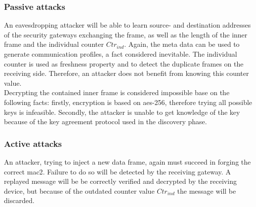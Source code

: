 \subsubsection{Passive attacks}
An eavesdropping attacker will be able to learn source- and destination addresses of the security gateways exchanging the frame, as well as the length of the inner frame and the
individual counter $Ctr_{ind}$. Again, the meta data can be used to generate communication profiles, a fact considered inevitable. The individual counter is used as freshness property
and to detect the duplicate frames on the receiving side. Therefore, an attacker does not benefit from knowing this counter value.
\\
Decrypting the contained inner frame is considered impossible base on the following facts: firstly, encryption is based on \gls{aes}-256, therefore trying all possible keys is infeasible.
Secondly, the attacker is unable to get knowledge of the key because of the key agreement protocol used in the discovery phase.
\subsubsection{Active attacks}
An attacker, trying to inject a new data frame, again must succeed in forging the correct \gls{mac2}. Failure to do so will be detected by the receiving gateway.
A replayed message will be be correctly verified and decrypted by the receiving device, but because of the outdated counter value $Ctr_{ind}$ the message will be discarded.

